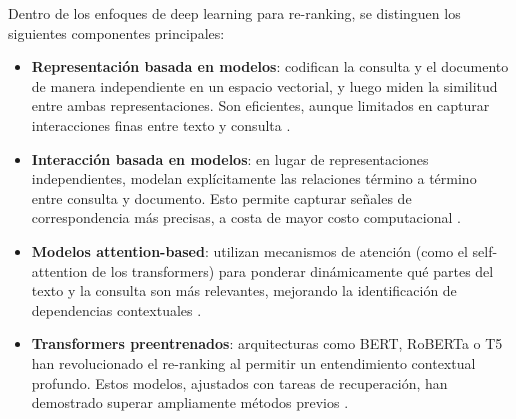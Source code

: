 Dentro de los enfoques de deep learning para re-ranking, se distinguen los siguientes componentes principales:

\begin{itemize}
    \item \textbf{Representación basada en modelos}: codifican la consulta y el documento de manera independiente en un espacio vectorial, y luego miden la similitud entre ambas representaciones. Son eficientes, aunque limitados en capturar interacciones finas entre texto y consulta \parencite{minaee2021}.
    
    \item \textbf{Interacción basada en modelos}: en lugar de representaciones independientes, modelan explícitamente las relaciones término a término entre consulta y documento. Esto permite capturar señales de correspondencia más precisas, a costa de mayor costo computacional \parencite{jiang2024textmatching}.
    
    \item \textbf{Modelos attention-based}: utilizan mecanismos de atención (como el self-attention de los transformers) para ponderar dinámicamente qué partes del texto y la consulta son más relevantes, mejorando la identificación de dependencias contextuales \parencite{hambarde2023ir}.
    
    \item \textbf{Transformers preentrenados}: arquitecturas como BERT, RoBERTa o T5 han revolucionado el re-ranking al permitir un entendimiento contextual profundo. Estos modelos, ajustados con tareas de recuperación, han demostrado superar ampliamente métodos previos \parencite{zhai2024llmIR}.
\end{itemize}

